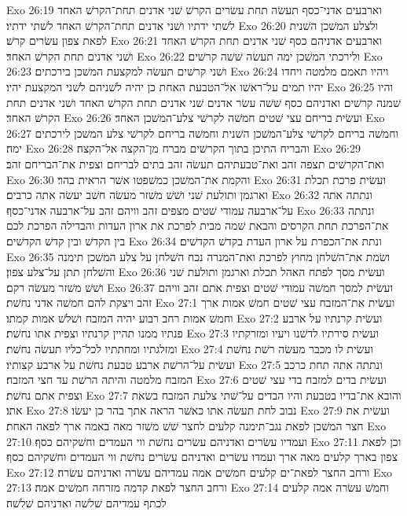Exo 26:19  וארבעים אדני־כסף תעשׂה תחת עשׂרים הקרשׁ שׁני אדנים תחת־הקרשׁ האחד לשׁתי ידתיו ושׁני אדנים תחת־הקרשׁ האחד לשׁתי ידתיו׃
Exo 26:20  ולצלע המשׁכן השׁנית לפאת צפון עשׂרים קרשׁ׃
Exo 26:21  וארבעים אדניהם כסף שׁני אדנים תחת הקרשׁ האחד ושׁני אדנים תחת הקרשׁ האחד׃
Exo 26:22  ולירכתי המשׁכן ימה תעשׂה שׁשׁה קרשׁים׃
Exo 26:23  ושׁני קרשׁים תעשׂה למקצעת המשׁכן בירכתים׃
Exo 26:24  ויהיו תאמם מלמטה ויחדו יהיו תמים על־ראשׁו אל־הטבעת האחת כן יהיה לשׁניהם לשׁני המקצעת יהיו׃
Exo 26:25  והיו שׁמנה קרשׁים ואדניהם כסף שׁשׁה עשׂר אדנים שׁני אדנים תחת הקרשׁ האחד ושׁני אדנים תחת הקרשׁ האחד׃
Exo 26:26  ועשׂית בריחם עצי שׁטים חמשׁה לקרשׁי צלע־המשׁכן האחד׃
Exo 26:27  וחמשׁה בריחם לקרשׁי צלע־המשׁכן השׁנית וחמשׁה בריחם לקרשׁי צלע המשׁכן לירכתים ימה׃
Exo 26:28  והבריח התיכן בתוך הקרשׁים מברח מן־הקצה אל־הקצה׃
Exo 26:29  ואת־הקרשׁים תצפה זהב ואת־טבעתיהם תעשׂה זהב בתים לבריחם וצפית את־הבריחם זהב׃
Exo 26:30  והקמת את־המשׁכן כמשׁפטו אשׁר הראית בהר׃
Exo 26:31  ועשׂית פרכת תכלת וארגמן ותולעת שׁני ושׁשׁ משׁזר מעשׂה חשׁב יעשׂה אתה כרבים׃
Exo 26:32  ונתתה אתה על־ארבעה עמודי שׁטים מצפים זהב וויהם זהב על־ארבעה אדני־כסף׃
Exo 26:33  ונתתה את־הפרכת תחת הקרסים והבאת שׁמה מבית לפרכת את ארון העדות והבדילה הפרכת לכם בין הקדשׁ ובין קדשׁ הקדשׁים׃
Exo 26:34  ונתת את־הכפרת על ארון העדת בקדשׁ הקדשׁים׃
Exo 26:35  ושׂמת את־השׁלחן מחוץ לפרכת ואת־המנרה נכח השׁלחן על צלע המשׁכן תימנה והשׁלחן תתן על־צלע צפון׃
Exo 26:36  ועשׂית מסך לפתח האהל תכלת וארגמן ותולעת שׁני ושׁשׁ משׁזר מעשׂה רקם׃
Exo 26:37  ועשׂית למסך חמשׁה עמודי שׁטים וצפית אתם זהב וויהם זהב ויצקת להם חמשׁה אדני נחשׁת׃
Exo 27:1  ועשׂית את־המזבח עצי שׁטים חמשׁ אמות ארך וחמשׁ אמות רחב רבוע יהיה המזבח ושׁלשׁ אמות קמתו׃
Exo 27:2  ועשׂית קרנתיו על ארבע פנתיו ממנו תהיין קרנתיו וצפית אתו נחשׁת׃
Exo 27:3  ועשׂית סירתיו לדשׁנו ויעיו ומזרקתיו ומזלגתיו ומחתתיו לכל־כליו תעשׂה נחשׁת׃
Exo 27:4  ועשׂית לו מכבר מעשׂה רשׁת נחשׁת ועשׂית על־הרשׁת ארבע טבעת נחשׁת על ארבע קצותיו׃
Exo 27:5  ונתתה אתה תחת כרכב המזבח מלמטה והיתה הרשׁת עד חצי המזבח׃
Exo 27:6  ועשׂית בדים למזבח בדי עצי שׁטים וצפית אתם נחשׁת׃
Exo 27:7  והובא את־בדיו בטבעת והיו הבדים על־שׁתי צלעת המזבח בשׂאת אתו׃
Exo 27:8  נבוב לחת תעשׂה אתו כאשׁר הראה אתך בהר כן יעשׂו׃
Exo 27:9  ועשׂית את חצר המשׁכן לפאת נגב־תימנה קלעים לחצר שׁשׁ משׁזר מאה באמה ארך לפאה האחת׃
Exo 27:10  ועמדיו עשׂרים ואדניהם עשׂרים נחשׁת ווי העמדים וחשׁקיהם כסף׃
Exo 27:11  וכן לפאת צפון בארך קלעים מאה ארך ועמדו עשׂרים ואדניהם עשׂרים נחשׁת ווי העמדים וחשׁקיהם כסף׃
Exo 27:12  ורחב החצר לפאת־ים קלעים חמשׁים אמה עמדיהם עשׂרה ואדניהם עשׂרה׃
Exo 27:13  ורחב החצר לפאת קדמה מזרחה חמשׁים אמה׃
Exo 27:14  וחמשׁ עשׂרה אמה קלעים לכתף עמדיהם שׁלשׁה ואדניהם שׁלשׁה׃
